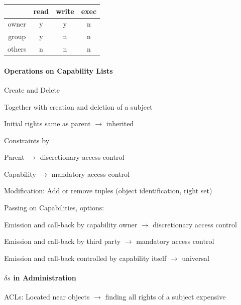 \documentclass[a4paper]{article}
\begin{document}
\begin{multicols}{3}
\begin{multicols}{2}
        \begin{tabular}{c | c | c| c}
                   & read & write & exec \\\hline
            owner  & y    & y     & n    \\
            group  & y    & n     & n    \\
            others & n    & n     & n
        \end{tabular}
    \end{multicols}

    \paragraph{Operations on Capability Lists}
    Create and Delete
    \begin{itemize*}
        \item Together with creation and deletion of a subject
        \item Initial rights same as parent $\rightarrow$ inherited
        \item Constraints by
        \begin{itemize*}
            \item Parent $\rightarrow$ discretionary access control
            \item Capability $\rightarrow$ mandatory access control
        \end{itemize*}
    \end{itemize*}

    Modification: Add or remove tuples (object identification, right set)

    Passing on Capabilities, options:
    \begin{itemize*}
        \item Emission and call-back by capability owner $\rightarrow$ discretionary access control
        \item Emission and call-back by third party $\rightarrow$ mandatory access control
        \item Emission and call-back controlled by capability itself $\rightarrow$ universal
    \end{itemize*}

    \paragraph{$\delta s$ in Administration}
    ACLs: Located near objects $\rightarrow$ finding all rights of a subject expensive


\end{multicols}
\end{document}

